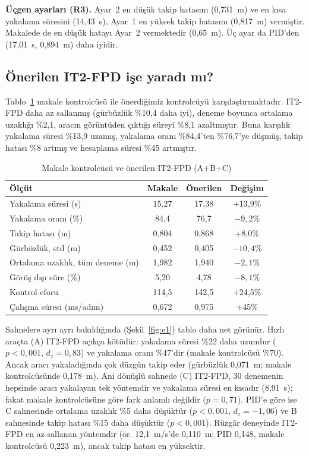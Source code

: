 \documentclass[conference,a4paper]{IEEEtran}
\begin{document}
\textbf{Üçgen ayarları (R3).} Ayar~2 en düşük takip hatasını (0,731~m) ve en kısa yakalama süresini (14,43~s), Ayar~1 en yüksek takip hatasını (0,817~m) vermiştir. Makalede de en düşük hatayı Ayar~2 vermektedir (0,65~m). Üç ayar da PID'den (17,01~s, 0,894~m) daha iyidir.

\subsection{Önerilen IT2-FPD işe yaradı mı?}
Tablo~\ref{tab:ext} makale kontrolcüsü ile önerdiğimiz kontrolcüyü karşılaştırmaktadır. IT2-FPD daha az sallanmış (gürbüzlük \%10,4 daha iyi), deneme boyunca ortalama uzaklığı \%2,1, aracın görüntüden çıktığı süreyi \%8,1 azaltmıştır. Buna karşılık yakalama süresi \%13,9 uzamış, yakalama oranı \%84,4'ten \%76,7'ye düşmüş, takip hatası \%8 artmış ve hesaplama süresi \%45 artmıştır.

\begin{table}[t]
\centering
\caption{Makale kontrolcüsü ve önerilen IT2-FPD (A+B+C)}
\label{tab:ext}
\footnotesize
\begin{tabular}{@{}lccc@{}}
\toprule
Ölçüt & Makale & Önerilen & Değişim \\
\midrule
Yakalama süresi (s) & 15,27 & 17,38 & +13,9\% \\
Yakalama oranı (\%) & 84,4 & 76,7 & $-9{,}2$\% \\
Takip hatası (m) & 0,804 & 0,868 & +8,0\% \\
Gürbüzlük, std (m) & 0,452 & 0,405 & $-10{,}4$\% \\
Ortalama uzaklık, tüm deneme (m) & 1,982 & 1,940 & $-2{,}1$\% \\
Görüş dışı süre (\%) & 5,20 & 4,78 & $-8{,}1$\% \\
Kontrol eforu & 114,5 & 142,5 & +24,5\% \\
Çalışma süresi (ms/adım) & 0,672 & 0,975 & +45\% \\
\bottomrule
\end{tabular}
\end{table}

Sahnelere ayrı ayrı bakıldığında (Şekil~\ref{fig:e1}) tablo daha net görünür. Hızlı araçta (A) IT2-FPD açıkça kötüdür: yakalama süresi \%22 daha uzundur ($p<0{,}001$, $d_z=0{,}83$) ve yakalama oranı \%47'dir (makale kontrolcüsü \%70). Ancak aracı yakaladığında çok düzgün takip eder (gürbüzlük 0,071~m; makale kontrolcüsünde 0,178~m). Ani dönüşlü sahnede (C) IT2-FPD, 30 denemenin hepsinde aracı yakalayan tek yöntemdir ve yakalama süresi en kısadır (8,91~s); fakat makale kontrolcüsüne göre fark anlamlı değildir ($p=0{,}71$). PID'e göre ise C sahnesinde ortalama uzaklık \%5 daha düşüktür ($p<0{,}001$, $d_z=-1{,}06$) ve B sahnesinde takip hatası \%15 daha düşüktür ($p<0{,}001$). Rüzgâr deneyinde IT2-FPD en az sallanan yöntemdir (ör. 12,1~m/s'de 0,110~m; PID 0,148, makale kontrolcüsü 0,223~m), ancak takip hatası en yüksektir.
\end{document}
